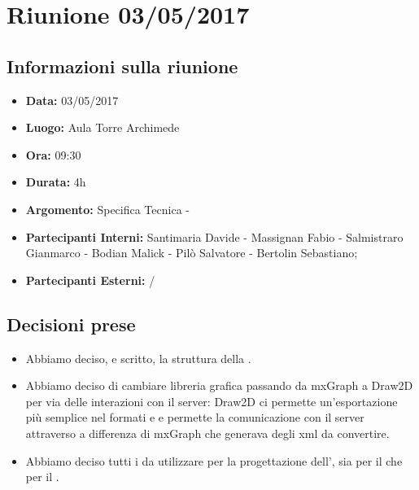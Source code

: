 \section{Riunione 03/05/2017}
  \subsection{Informazioni sulla riunione}
    \begin{itemize}
      \item \textbf{Data: }03/05/2017
      \item \textbf{Luogo: }Aula Torre Archimede
      \item \textbf{Ora: }09:30
      \item \textbf{Durata: }4h
      \item \textbf{Argomento: }Specifica Tecnica - 
      \item \textbf{Partecipanti Interni: }Santimaria Davide - Massignan Fabio - Salmistraro Gianmarco - Bodian Malick - Pilò Salvatore - Bertolin Sebastiano;
      \item \textbf{Partecipanti Esterni: }/
    \end{itemize}
  \subsection{Decisioni prese}
		\begin{itemize}
			\item Abbiamo deciso, e scritto, la struttura della \versioneST.
      \item Abbiamo deciso di cambiare libreria grafica passando da mxGraph a Draw2D per via delle interazioni con il server: Draw2D ci permette un'esportazione più semplice
      nel formati  e  e permette la comunicazione con il server attraverso  a differenza di mxGraph che generava degli xml da convertire.
      \item Abbiamo deciso tutti i  da utilizzare per la progettazione dell', sia per il  che per il .
		\end{itemize}
